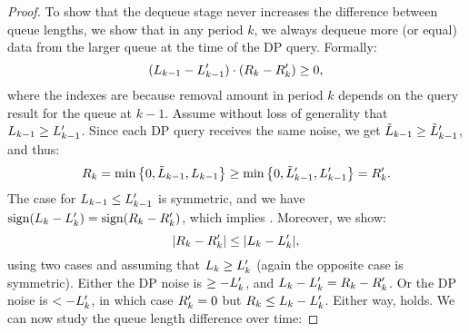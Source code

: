 {\begin{proof}

To show that the dequeue stage never increases the difference between queue
lengths, we show that in any period $k$, we always dequeue more (or equal) data from
the larger queue at the time of the DP query. Formally:
\vspace{-0.2cm}
\begin{equation}\label{equ:queue-dequeue}
        (L_{k-1} - L_{k-1}') \cdot ({R}_{k} - {R}_{k}') \geq 0 ,
\end{equation}
where the indexes are because removal amount in period $k$ depends on the
query result for the queue at $k-1$.
%
Assume without loss of generality that $L_{k-1} \geq L_{k-1}'$.
Since each DP query receives the same noise, we get $\tilde{L}_{k-1} \geq
\tilde{L}_{k-1}'$,
and thus:
\[
  {R}_{k} = \min\big\{0, \tilde{L}_{k-1}, L_{k-1} \big\} \geq
\min\big\{0, \tilde{L}_{k-1}', L_{k-1}'\big\} = {R}_{k}' .
\]
The case for $L_{k-1} \leq L_{k-1}'$ is symmetric, and we have
 $\textrm{sign}(L_{k} - L_{k}') = \textrm{sign}({R}_{k} - {R}_{k}')$,
which implies .
%
Moreover, we show:
\begin{equation}\label{equation:deuque-size}
\vspace{-0.1cm}
  |{\payload}_{k} - {\payload}_{k}'| \leq |\qlent{k} - \qlent{k}'| ,
\end{equation}
using two cases and assuming that $L_{k} \geq L_{k}'$ (again the
opposite case is
symmetric). Either the DP noise is $\geq -L_{k}'$, and $L_{k} -
L_{k}' = {R}_{k} - {R}_{k}'$. Or the DP noise is  $< -
L_{k}'$, in which case ${R}_{k}' = 0$ but ${R}_{k} \leq
L_{k} - L_{k}'$. Either way,  holds.
%
We can now study the queue length difference over time:

\end{proof}}
